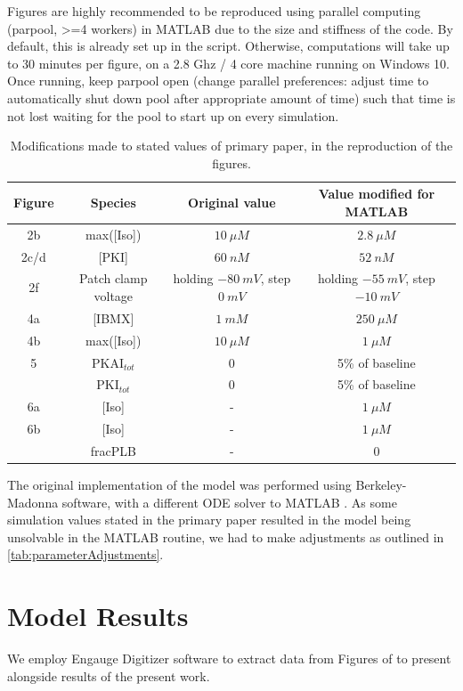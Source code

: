 \documentclass[fleqn,10pt]{physiome}
\begin{document}
Figures are highly recommended to be reproduced using parallel computing (parpool, >=4 workers) in MATLAB due to the size and stiffness of the code. By default, this is already set up in the script. Otherwise, computations will take up to 30 minutes per figure, on a 2.8 Ghz / 4 core machine running on Windows 10.
Once running, keep parpool open (change parallel preferences: adjust time to automatically shut down pool after appropriate amount of time) such that time is not lost waiting for the pool to start up on every simulation.

\begin{table}[]
    \centering
    \begin{tabular}{|c|c|c|c|}
    \hline
         Figure & Species & Original value & Value modified for MATLAB \\
         \hline
         2b & max([Iso]) & $10\ \mu M$ & $2.8\ \mu M$ \\
         2c/d & [PKI] & $60\ nM$ & $52\ nM$ \\
         2f & Patch clamp voltage & holding $-80\ mV$, step $0\ mV$ & holding $-55\ mV$, step $-10\ mV$\\
         4a & [IBMX] & $1\ mM$ & $250\ \mu M$\\
         4b & max([Iso]) & $10\ \mu M$ & $1\ \mu M$ \\
         5 & PKAI$_{tot}$& 0 & 5\% of baseline\\
           & PKI$_{tot}$& 0 & 5\% of baseline\\
         6a & [Iso] & - & $1\ \mu M$ \\
         6b & [Iso] & - & $1\ \mu M$ \\
            & fracPLB & - & 0 \\
        \hline
    \end{tabular}
    \caption{Modifications made to stated values of primary paper, in the reproduction of the figures.}
    \label{tab:parameterAdjustments}
\end{table}
The original implementation of the model was performed using Berkeley-Madonna software, with a different ODE solver to MATLAB \citep{saucerman2003}. As some simulation values stated in the primary paper resulted in the model being unsolvable in the MATLAB routine, we had to make adjustments as outlined in \autoref{tab:parameterAdjustments}.

\section{Model Results}
We employ Engauge Digitizer software \citep{mark_mitchell_2020_3941227} to extract data from Figures of \cite{saucerman2003} to present alongside results of the present work.
\end{document}
